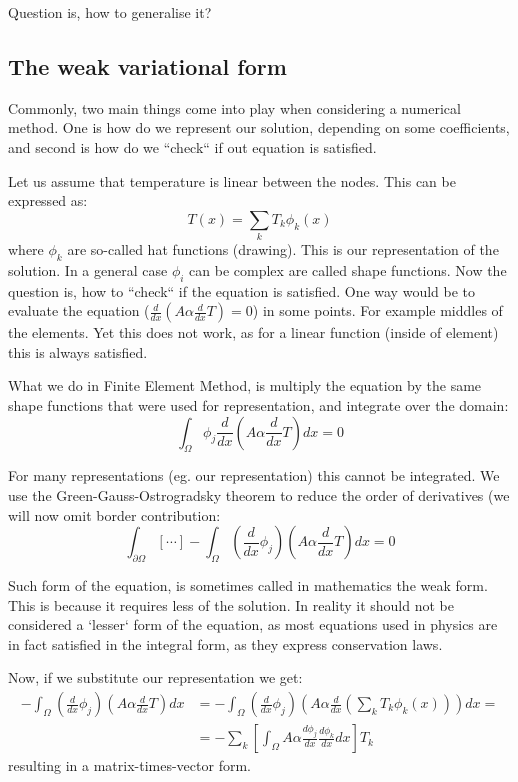 \documentclass[12pt]{article}
\begin{document}
Question is, how to generalise it?
\subsection{The weak variational form}
Commonly, two main things come into play when considering a numerical method. One is how do we represent our solution, depending on some coefficients, and second is how do we ``check`` if out equation is satisfied.

Let us assume that temperature is linear between the nodes. This can be expressed as:
\[T(x) = \sum_k T_k\phi_k(x)\]
where $\phi_k$ are so-called hat functions (drawing). This is our representation of the solution. In a general case $\phi_i$ can be complex are called shape functions. Now the question is, how to ``check`` if the equation is satisfied. One way would be to evaluate the equation ($\frac{d}{dx}\left(A\alpha\frac{d}{dx}T\right)=0$) in some points. For example middles of the elements. Yet this does not work, as for a linear function (inside of element) this is always satisfied.

What we do in Finite Element Method, is multiply the equation by the same shape functions that were used for representation, and integrate over the domain:
\[\int_\Omega\phi_j\frac{d}{dx}\left(A\alpha\frac{d}{dx}T\right)dx = 0\]

For many representations (eg. our representation) this cannot be integrated. We use the Green-Gauss-Ostrogradsky theorem to reduce the order of derivatives (we will now omit border contribution:
\[\int_{\partial\Omega}[\cdots]-\int_\Omega\left(\frac{d}{dx}\phi_j\right)\left(A\alpha\frac{d}{dx}T\right)dx = 0\]

Such form of the equation, is sometimes called in mathematics the weak form. This is because it requires less of the solution. In reality it should not be considered a `lesser` form of the equation, as most equations used in physics are in fact satisfied in the integral form, as they express conservation laws.

Now, if we substitute our representation we get:
\begin{align*}
-\int_\Omega\left(\frac{d}{dx}\phi_j\right)\left(A\alpha\frac{d}{dx}T\right)dx &= -\int_\Omega\left(\frac{d}{dx}\phi_j\right)\left(A\alpha\frac{d}{dx}\left(\sum_kT_k\phi_k(x)\right)\right)dx =\\
&= -\sum_k\left[\int_\Omega A\alpha\frac{d\phi_j}{dx}\frac{d\phi_k}{dx}dx\right]T_k 
\end{align*}
resulting in a matrix-times-vector form.
\end{document}
